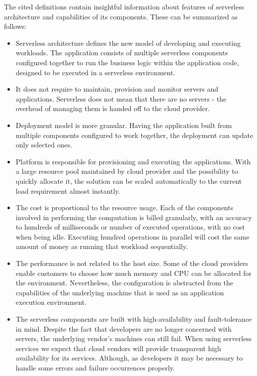 The cited definitions contain insightful information about features of serverless architecture and capabilities of its components. These can be summarized as follows:

\begin{itemize}
    \item Serverless architecture defines the new model of developing and executing workloads. The application consists of multiple serverless components configured together to run the business logic within the application code, designed to be executed in a serverless environment.
    \item It does not require to maintain, provision and monitor servers and applications. Serverless does not mean that there are no servers - the overhead of managing them is handed off to the cloud provider.
    \item Deployment model is more granular. Having the application built from multiple components configured to work together, the deployment can update only selected ones.
    \item Platform is responsible for provisioning and executing the applications. With a large resource pool maintained by cloud provider and the possibility to quickly allocate it, the solution can be scaled automatically to the current load requirement almost instantly.
    \item The cost is proportional to the resource usage. Each of the components involved in performing the computation is billed granularly, with an accuracy to hundreds of milliseconds or number of executed operations, with no cost when being idle. Executing hundred operations in parallel will cost the same amount of money as running that workload sequentially.
    \item The performance is not related to the host size. Some of the cloud providers enable customers to choose how much memory and CPU can be allocated for the environment. Nevertheless, the configuration is abstracted from the capabilities of the underlying machine that is used as an application execution environment.
    \item The serverless components are built with high-availability and fault-tolerance in mind. Despite the fact that developers are no longer concerned with servers, the underlying vendor's machines can still fail. When using serverless services we expect that cloud vendors will provide transparent high availability for its services. Although, as developers it may be necessary to handle some errors and failure occurrences properly.
\end{itemize}

